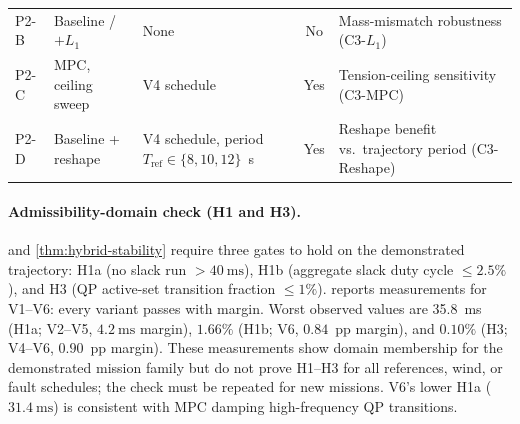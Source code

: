 \documentclass[lettersize,journal]{IEEEtran}
\begin{document}
\begin{table}[htbp]
\begin{tabular}{llp{5.5cm}cp{5cm}}
    P2-B & Baseline / $+L_1$    & None                                                                                  & No   & Mass-mismatch robustness (C3-$L_1$) \\
    P2-C & MPC, ceiling sweep   & V4 schedule                                                                           & Yes  & Tension-ceiling sensitivity (C3-MPC) \\
    P2-D & Baseline + reshape   & V4 schedule, period $T_{\mathrm{ref}} \in \{8,10,12\}$~s                              & Yes  & Reshape benefit vs.\ trajectory period (C3-Reshape) \\
    \bottomrule
  \end{tabular}
\end{table}

\paragraph{Admissibility-domain check (H1 and H3).}  and \cref{thm:hybrid-stability} require three gates to hold on the demonstrated trajectory: H1a (no slack run $> \SI{40}{\milli\second}$), H1b (aggregate slack duty cycle $\le 2.5\%$), and H3 (QP active-set transition fraction $\le 1\%$).  reports measurements for V1--V6: every variant passes with margin. Worst observed values are \SI{35.8}{\milli\second} (H1a; V2--V5, $\SI{4.2}{\milli\second}$ margin), $1.66\%$ (H1b; V6, $0.84$~pp margin), and $0.10\%$ (H3; V4--V6, $0.90$~pp margin). These measurements show domain membership for the demonstrated mission family but do not prove H1--H3 for all references, wind, or fault schedules; the check must be repeated for new missions. V6's lower H1a ($\SI{31.4}{\milli\second}$) is consistent with MPC damping high-frequency QP transitions.
\end{document}
